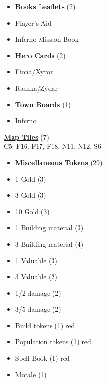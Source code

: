 
\begin{multicols}{3}

\small

\begin{itemize}[leftmargin=0pt, label={}, noitemsep, noitemsep]
  \item \textbf{\underline{Books Leaflets}} (2)
  \item Player's Aid
  \item Inferno Mission Book
\end{itemize}

\begin{itemize}[leftmargin=0pt, label={}, noitemsep, noitemsep]
  \item \textbf{\underline{Hero Cards}} (2)
  \item Fiona/Xyron
  \item Rashka/Zydar
\end{itemize}

\begin{itemize}[leftmargin=0pt, label={}, noitemsep, noitemsep]
  \item \textbf{\underline{Town Boards}} (1)
  \item Inferno
\end{itemize}

\textbf{\underline{Map Tiles}} (7)\\
C5, F16, F17, F18, N11, N12, S6

\begin{itemize}[leftmargin=0pt, label={}, noitemsep, noitemsep]
  \item \textbf{\underline{Miscellaneous Tokens}} (29)
  \item 1 Gold (3)
  \item 3 Gold (3)
  \item 10 Gold (3)
  \item 1 Building material (3)
  \item 3 Building material (4)
  \item 1 Valuable (3)
  \item 3 Valuable (2)
  \item 1/2 damage (2)
  \item 3/5 damage (2)
  \item Build tokens (1) {red}
  \item Population tokens (1) {red}
  \item Spell Book (1) {red}
  \item Morale (1)
\end{itemize}


\end{multicols}
